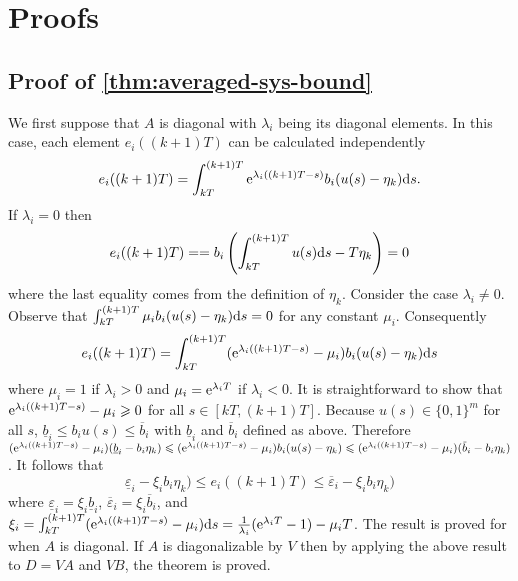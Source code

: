 \section{Proofs}

\subsection{Proof of \protect\cref{thm:averaged-sys-bound}}
\label{sec:proof:averaged-sys-bound}

  We first suppose that $A$ is diagonal with $\lambda_{i}$ being its diagonal elements.
  In this case, each element $e_i ((k + 1) T)$ can be calculated
  independently
  \[ e_i ((k + 1) T) = \int_{kT}^{(k + 1) T} \mathrm{e}^{\lambda_i ((k + 1) T - s)} b_i 
     (u (s) - \eta_k) \mathrm{d} s \text{.} \]
  If $\lambda_i = 0$ then
  \[ e_i ((k + 1) T) = %
  = b_i  \left( \int_{kT}^{(k + 1) T} u (s) \mathd s - T \eta_k \right) = 0
  \]
  where the last equality comes from the definition of $\eta_k$. Consider the
  case $\lambda_i \neq 0$. Observe that $\int_{kT}^{(k + 1) T} \mu_i b_i  (u (s)
  - \eta_k) \mathrm{d} s = 0$ for any constant $\mu_i$. Consequently
  \[ e_i ((k + 1) T) = \int_{kT}^{(k + 1) T} (\mathrm{e}^{\lambda_i ((k + 1) T - s)} -
     \mu_i ) b_i  (u (s) - \eta_k) \mathrm{d} s \]
  where $\mu_i = 1$ if $\lambda_i > 0$ and $\mu_i = \mathrm{e}^{\lambda_i T}$ if $\lambda_i
  < 0$. It is straightforward to show that $\mathrm{e}^{\lambda_i ((k + 1) T - s)} -
  \mu_i \geqslant 0$ for all $s \in [kT, (k + 1) T]$. Because $u (s) \in
  \{ 0, 1 \}^m$ for all $s$, $\underline{b}_i \leqslant b_i u (s)
  \leqslant \overbar{b}_i$ with $\underline{b}_i$ and
  $\overbar{b}_i$ defined as above. Therefore $(\mathe^{\lambda_i ((k +
  1) T - s)} - \mu_i )  (\underline{b}_i - b_i \eta_k) \leqslant
  (\mathe^{\lambda_i ((k + 1) T - s)} - \mu_i ) b_i  (u (s) - \eta_k) \leqslant
  (\mathe^{\lambda_i ((k + 1) T - s)} - \mu_i )  (\overbar{b}_i - b_i
  \eta_k)$. It follows that
  \[ \underline{\varepsilon}_i - \xi_i b_i \eta_k) \leqslant 
  e_i ((k + 1) T)
  \leqslant \overbar{\varepsilon}_i - \xi_i b_i \eta_k) \]
  where $\underline{\varepsilon}_{i} = \xi_{i} \underline{b}_{i}$, $\overbar{\varepsilon}_{i} = \xi_{i} \overbar{b}_{i}$, and $\xi_i = \int_{kT}^{(k + 1) T} (\mathrm{e}^{\lambda_i ((k + 1) T - s)} -
  \mu_i ) \mathrm{d} s = \frac{1}{\lambda_i} (\mathrm{e}^{\lambda_i T} - 1) - \mu_i T$.
  The result is proved for when $A$ is diagonal.
  If $A$ is diagonalizable by $V$ then by applying the above result to $D = V A$ and $V B$, the theorem is proved.

